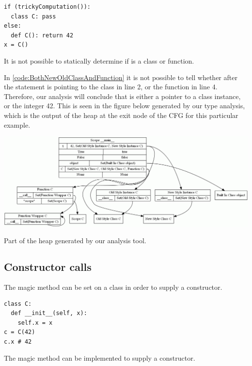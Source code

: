\begin{listing}[H]
	\begin{verbatim}
if (trickyComputation()):
  class C: pass
else:
  def C(): return 42
x = C()
	\end{verbatim}
	\caption{It is not possible to statically determine if  is a class or function.}
	\label{code:BothNewOldClassAndFunction}
\end{listing}

In \autoref{code:BothNewOldClassAndFunction} it is not possible to tell whether  after the  statement is pointing to the class in line 2, or the function in line 4. Therefore, our analysis will conclude that  is either a pointer to a class instance, or the integer 42. This is seen in the figure below generated by our type analysis, which is the output of the heap at the exit node of the CFG for this particular example.

\begin{listing}[H]
	\begin{center}
		\includegraphics[width=1\textwidth]{images/BothNewOldClassAndFunction.png}
	\end{center}
	\vspace{-10pt}
	\caption{Part of the heap generated by our analysis tool.}
	\label{fig:BothNewOldClassAndFunction}
\end{listing}


\subsection{Constructor calls}
\label{section:Constructor calls}
The magic method  can be set on a class in order to supply a constructor.

\begin{listing}[H]
	\begin{verbatim}
class C:
  def __init__(self, x):
    self.x = x
c = C(42)
c.x # 42
	\end{verbatim}
	\caption{The magic method  can be implemented to supply a constructor.}\label{code:InitConstructorClass}
\end{listing}

